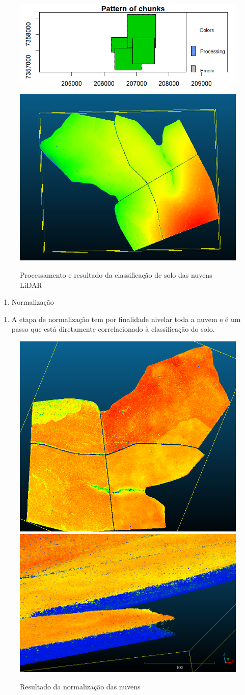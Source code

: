 \documentclass[
]{article}
\providecommand{\tightlist}{%
  \setlength{\itemsep}{0pt}\setlength{\parskip}{0pt}}
\begin{document}
\begin{figure}

{\centering \includegraphics[width=0.4\linewidth]{IMAGES/classificacao-pontos-de-solo} \includegraphics[width=0.4\linewidth]{IMAGES/nuvem-com-pontos-de-solo-classificados-mas-sem-normalizacao} 

}

\caption{Processamento e resultado da classificação de solo das nuvens LiDAR}\label{fig:unnamed-chunk-13}
\end{figure}

\newpage

\begin{enumerate}
\def\labelenumi{\arabic{enumi}.}
\setcounter{enumi}{8}
\tightlist
\item
  Normalização
\end{enumerate}

\begin{enumerate}
\def\labelenumi{\roman{enumi}.}
\tightlist
\item
  A etapa de normalização tem por finalidade nivelar toda a nuvem e é um
  passo que está diretamente correlacionado à classificação do solo.
\end{enumerate}

\begin{figure}

{\centering \includegraphics[width=0.4\linewidth]{IMAGES/nuvensnormalizadas} \includegraphics[width=0.4\linewidth]{IMAGES/nivelamento} 

}

\caption{Resultado da normalização das nuvens}\label{fig:unnamed-chunk-14}
\end{figure}
\end{document}
